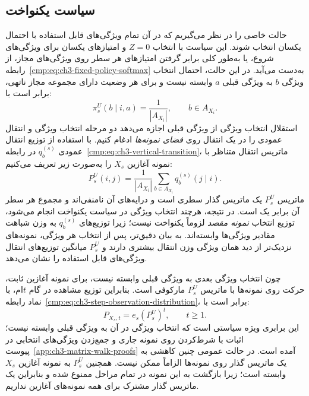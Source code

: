\subsection{سیاست یکنواخت}
\label{cmp:subsec:ch3-uniform-policy}
حالت خاصی را در نظر می‌گیریم که در آن تمام ویژگی‌های قابل استفاده با احتمال یکسان انتخاب شوند. این سیاست با انتخاب $Z=0$ و امتیازهای یکسان برای ویژگی‌های شروع، یا به‌طور کلی برابر گرفتن امتیازهای هر سطر روی ویژگی‌های مجاز، از رابطه~\eqref{cmp:eq:ch3-fixed-policy-softmax} به‌دست می‌آید. در این حالت، احتمال انتخاب ویژگی $b$ به ویژگی قبلی $a$ وابسته نیست و برای هر وضعیت دارای مجموعه مجاز ناتهی، برابر است با:
\begin{equation}\label{cmp:eq:ch3-uniform-policy}
\pi_s^{U}(b\mid i,a)=\frac{1}{|A_{X_i}|},
\qquad b\in A_{X_i}.
\end{equation}
استقلال انتخاب ویژگی از ویژگی قبلی اجازه می‌دهد دو مرحله انتخاب ویژگی و انتقال عمودی را در یک انتقال روی \emph{فضای نمونه‌ها} ادغام کنیم. با استفاده از توزیع انتقال عمودی $q_b^{(s)}$ در رابطه~\eqref{cmp:eq:ch3-vertical-transition}، ماتریس انتقال متناظر با نمونه آغازین $X_s$ را به‌صورت زیر تعریف می‌کنیم:
\begin{equation}\label{cmp:eq:ch3-uniform-T}
P_s^{U}(i,j)=\frac{1}{|A_{X_i}|}
\sum_{b\in A_{X_i}}q_b^{(s)}(j\mid i).
\end{equation}
ماتریس $P_s^{U}$ یک ماتریس گذار سطری است و درایه‌های آن نامنفی‌اند و مجموع هر سطر آن برابر یک است. در نتیجه، هرچند انتخاب ویژگی در سیاست یکنواخت انجام می‌شود، توزیع انتخاب \emph{نمونه مقصد} لزوماً یکنواخت نیست؛ زیرا توزیع‌های $q_b^{(s)}$ به وزن شباهت مقادیر ویژگی‌ها وابسته‌اند. به بیان دقیق‌تر، پس از انتخاب هر ویژگی، نمونه‌های نزدیک‌تر از دید همان ویژگی وزن انتقال بیشتری دارند و $P_s^{U}$ میانگین توزیع‌های انتقال ویژگی‌های قابل استفاده را نشان می‌دهد.

چون انتخاب ویژگی بعدی به ویژگی قبلی وابسته نیست، برای نمونه آغازین ثابت، حرکت روی نمونه‌ها با ماتریس $P_s^{U}$ مارکوفی است. بنابراین توزیع مشاهده در گام $t$ام، با نماد رابطه~\eqref{cmp:eq:ch3-step-observation-distribution}، برابر است با:
\begin{equation}\label{cmp:eq:ch3-uniform-step-distribution}
P_{X_s,t}=e_s(P_s^{U})^t,\qquad t\ge1.
\end{equation}
این برابری ویژه سیاستی است که انتخاب ویژگی در آن به ویژگی قبلی وابسته نیست؛ اثبات با شرط‌کردن روی نمونه جاری و جمع‌زدن ویژگی‌های انتخابی در پیوست~\ref{app:ch3-matrix-walk-proofs} آمده است. در حالت عمومی چنین کاهشی به یک ماتریس گذار روی نمونه‌ها الزاماً ممکن نیست. همچنین $P_s^{U}$ به نمونه آغازین $X_s$ وابسته است؛ زیرا بازگشت به این نمونه در تمام مراحل ممنوع شده و بنابراین یک ماتریس گذار مشترک برای همه نمونه‌های آغازین نداریم.

